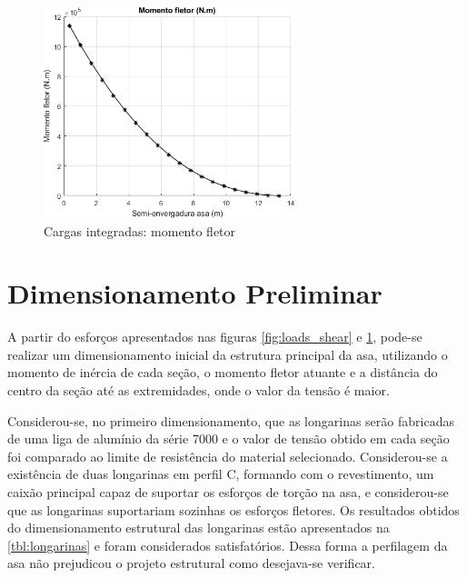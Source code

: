 \begin{figure}[H]
\centering
\includegraphics[width=0.65\textwidth]{images/parte3/loads_bending.png}
\caption{Cargas integradas: momento fletor}
\label{fig:loads_bending}
\end{figure}


\clearpage
\section{Dimensionamento Preliminar}

A partir do esforços apresentados nas figuras \ref{fig:loads_shear} e \ref{fig:loads_bending}, pode-se realizar um dimensionamento inicial da estrutura principal da asa, utilizando o momento de inércia de cada seção, o momento fletor atuante e a distância do centro da seção até as extremidades, onde o valor da tensão é maior.

Considerou-se, no primeiro dimensionamento, que as longarinas serão fabricadas de uma liga de alumínio da série 7000 e o valor de tensão obtido em cada seção foi comparado ao limite de resistência do material selecionado. Considerou-se a existência de duas longarinas em perfil C, formando com o revestimento, um caixão principal capaz de suportar os esforços de torção na asa, e considerou-se que as longarinas suportariam sozinhas os esforços fletores. Os resultados obtidos do dimensionamento estrutural das longarinas estão apresentados na \autoref{tbl:longarinas} e foram considerados satisfatórios. Dessa forma a perfilagem da asa não prejudicou o projeto estrutural como desejava-se verificar.


